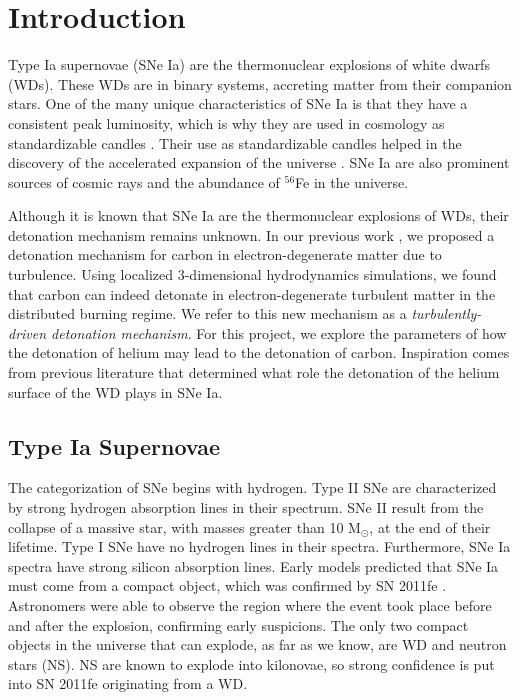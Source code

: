 \chapter{Introduction}

Type Ia supernovae (SNe Ia) are the thermonuclear explosions of white dwarfs (WDs). These WDs are in binary systems, accreting matter from their companion stars. One of the many unique characteristics of SNe Ia is that they have a consistent peak luminosity, which is why they are used in cosmology as standardizable candles \cite{phillips93}. Their use as standardizable candles helped in the discovery of the accelerated expansion of the universe \cite{Riess98}. SNe Ia are also prominent sources of cosmic rays and the abundance of $^{56}$Fe in the universe.

Although it is known that SNe Ia are the thermonuclear explosions of WDs, their detonation mechanism remains unknown. In our previous work \cite{Fisher}, we proposed a detonation mechanism for carbon in electron-degenerate matter due to turbulence. Using localized 3-dimensional hydrodynamics simulations, we found that carbon can indeed detonate in electron-degenerate turbulent matter in the distributed burning regime. We refer to this new mechanism as a \textit{turbulently-driven detonation mechanism}. For this project, we explore the parameters of how the detonation of helium may lead to the detonation of carbon. Inspiration comes from previous literature that determined what role the detonation of the helium surface of the WD plays in SNe Ia.  

\section{Type Ia Supernovae}

The categorization of SNe begins with hydrogen. Type II SNe are characterized by strong hydrogen absorption lines in their spectrum. SNe II result from the collapse of a massive star, with masses greater than 10 M$_{\odot}$, at the end of their lifetime. Type I SNe have no hydrogen lines in their spectra. Furthermore, SNe Ia spectra have strong silicon absorption lines. Early models predicted that SNe Ia must come from a compact object, which was confirmed by SN 2011fe \cite{Nugent_2011}. Astronomers were able to observe the region where the event took place before and after the explosion, confirming early suspicions. The only two compact objects in the universe that can explode, as far as we know, are WD and neutron stars (NS). NS are known to explode into kilonovae, so strong confidence is put into SN 2011fe originating from a WD.

